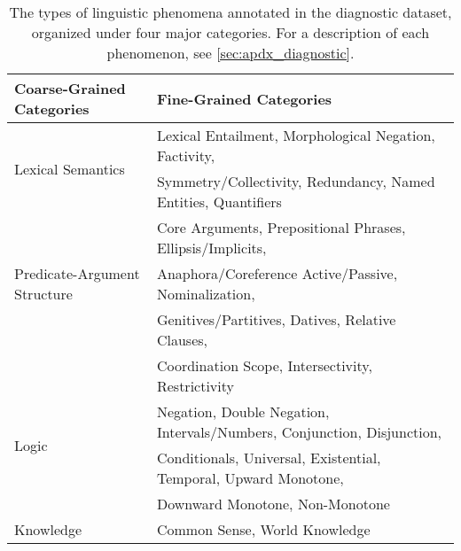 \documentclass{article} \usepackage{iclr2019_conference,times}
\begin{document}
\begin{table*}[t]
\small
\centering
\begin{tabular}{ll}
\toprule
\textbf{Coarse-Grained Categories} & \textbf{Fine-Grained Categories} \\
\midrule
\multirow{2}{*}{Lexical Semantics} & Lexical Entailment, Morphological Negation, Factivity, \\ & Symmetry/Collectivity, Redundancy, Named Entities, Quantifiers \\
\midrule
\multirow{3}{*}{Predicate-Argument Structure} & Core Arguments, Prepositional Phrases, Ellipsis/Implicits, \\ & Anaphora/Coreference
Active/Passive, Nominalization, \\ & Genitives/Partitives, Datives, Relative Clauses, \\
& Coordination Scope, Intersectivity, Restrictivity \\
\midrule
\multirow{2}{*}{Logic} & Negation, Double Negation, Intervals/Numbers, Conjunction, Disjunction, \\ & Conditionals, Universal, Existential, Temporal, Upward Monotone, \\ & Downward Monotone, Non-Monotone \\
\midrule
Knowledge & Common Sense, World Knowledge\\

\bottomrule
\end{tabular}
\caption{The types of linguistic phenomena annotated in the diagnostic dataset, organized under four major categories. For a description of each phenomenon, see \autoref{sec:apdx_diagnostic}.}
\label{tab:analysis-categories}
\end{table*}
\end{document}
